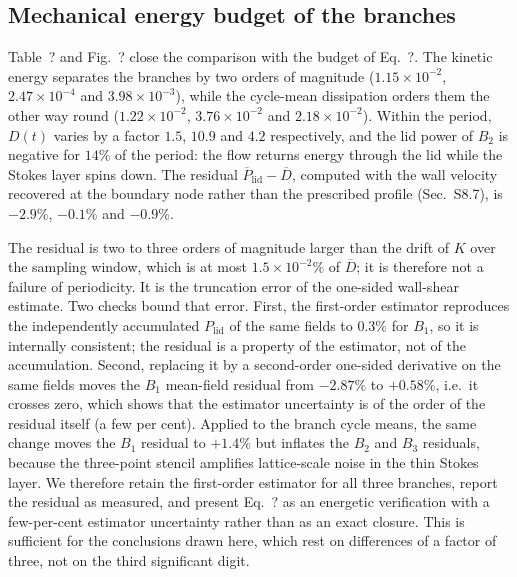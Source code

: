 \documentclass[11pt,a4paper]{article}
\newcommand{\Dbar}{\overline{D}}
\newcommand{\Plid}{P_{\mathrm{lid}}}
\newenvironment{chgdel}{\par\color{red}}{\par\color{black}}
\begin{document}
\subsection{Mechanical energy budget of the branches}
\label{sec:budget}

\begin{chgdel}
Table~? and Fig.~? close the comparison with the
budget of Eq.~?. The kinetic energy separates the branches by two
orders of magnitude ($1.15\times10^{-2}$, $2.47\times10^{-4}$ and
$3.98\times10^{-3}$), while the cycle-mean dissipation orders them the other way
round ($1.22\times10^{-2}$, $3.76\times10^{-2}$ and $2.18\times10^{-2}$). Within
the period, $D(t)$ varies by a factor $1.5$, $10.9$ and $4.2$ respectively, and
the lid power of $B_2$ is negative for $14\%$ of the period: the flow returns
energy through the lid while the Stokes layer spins down. The residual
$\overline{P}_{\mathrm{lid}}-\Dbar$, computed with the wall velocity recovered at
the boundary node rather than the prescribed profile (Sec.~S8.7), is
$-2.9\%$, $-0.1\%$ and $-0.9\%$.

The residual is two to three orders of magnitude larger than the drift of $K$ over
the sampling window, which is at most $1.5\times10^{-2}\%$ of $\Dbar$; it is
therefore not a failure of periodicity. It is the truncation error of the
one-sided wall-shear estimate. Two checks bound that error. First, the first-order
estimator reproduces the independently accumulated $\Plid$ of the same fields to
$0.3\%$ for $B_1$, so it is internally consistent; the residual is a property of
the estimator, not of the accumulation. Second, replacing it by a second-order
one-sided derivative on the same fields moves the $B_1$ mean-field residual from
$-2.87\%$ to $+0.58\%$, i.e.\ it crosses zero, which shows that the estimator
uncertainty is of the order of the residual itself (a few per cent). Applied to
the branch cycle means, the same change moves the $B_1$ residual to $+1.4\%$ but
inflates the $B_2$ and $B_3$ residuals, because the three-point stencil amplifies
lattice-scale noise in the thin Stokes layer. We therefore retain the first-order
estimator for all three branches, report the residual as measured, and present
Eq.~? as an energetic verification with a few-per-cent estimator
uncertainty rather than as an exact closure. This is sufficient for the
conclusions drawn here, which rest on differences of a factor of three, not on
the third significant digit.
\end{chgdel}
\end{document}
